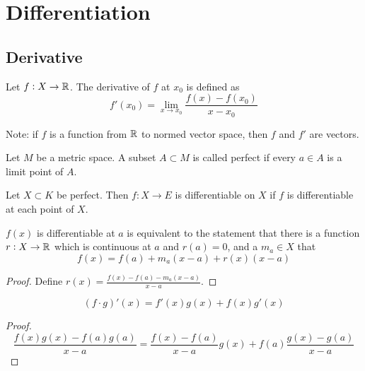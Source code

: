 \chapter{Differentiation}

\section{Derivative}

\begin{definition}
    Let $f: X \rightarrow \mathbb{R}$. The derivative of $f$ at $x_0$ is defined as
    \begin{equation}
        f'(x_0) = \lim_{x \rightarrow x_0} \frac{f(x) - f(x_0)}{x - x_0}
    \end{equation}    
    
    Note: if $f$ is a function from $\mathbb{R}$ to normed vector space, then $f$ and $f'$ are vectors.
\end{definition}

\begin{definition}
    Let $M$ be a metric space. A subset $A \subset M$ is called perfect if every $a \in A$ is a limit point of $A$.
\end{definition}

\begin{definition}
    Let $X \subset K$ be perfect. Then $f: X \rightarrow E$ is differentiable on $X$ if $f$ is differentiable at each point of $X$.
\end{definition}


\begin{theorem}
    $f(x)$ is differentiable at $a$ is equivalent to the statement that there is a function $r: X \rightarrow \mathbb{R}$ which is continuous at $a$ and $r(a)=0$, and a $m_a \in X$ that
    \begin{equation}
        f(x) = f(a) + m_a (x-a) + r(x)(x-a)
    \end{equation}
\end{theorem}
\begin{proof}
    Define $\displaystyle r(x) = \frac{f(x) - f(a) - m_a (x-a)}{x-a}$.
\end{proof}

\begin{theorem}
    \begin{equation}
        (f \cdot g)' (x) = f'(x) g(x) + f(x) g'(x)
    \end{equation}    
\end{theorem}
\begin{proof}
    \begin{equation}
        \frac{f(x)g(x) - f(a)g(a)}{x - a} = \frac{f(x) - f(a)}{x-a} g(x) + f(a) \frac{g(x) - g(a)}{x-a}
    \end{equation}
\end{proof}

